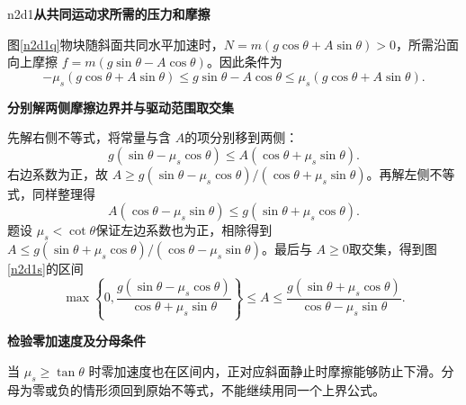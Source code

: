 \LectureAnswerSection

\begin{drillsolution}{n2d1}\textbf{从共同运动求所需的压力和摩擦}\par\nobreak
图\ref{n2d1q}物块随斜面共同水平加速时，$N=m(g\cos\theta+A\sin\theta)>0$，所需沿面向上摩擦 $f=m(g\sin\theta-A\cos\theta)$。因此条件为
\[-\mu_s(g\cos\theta+A\sin\theta)\le g\sin\theta-A\cos\theta\le\mu_s(g\cos\theta+A\sin\theta).\]



\par\medskip{}\noindent\textbf{分别解两侧摩擦边界并与驱动范围取交集}\par\nobreak
先解右侧不等式，将常量与含 $A$的项分别移到两侧：
\[
 g(\sin\theta-\mu_s\cos\theta)
 \le A(\cos\theta+\mu_s\sin\theta).
\]
右边系数为正，故 $A\ge g(\sin\theta-\mu_s\cos\theta)/(\cos\theta+\mu_s\sin\theta)$。再解左侧不等式，同样整理得
\[
 A(\cos\theta-\mu_s\sin\theta)
 \le g(\sin\theta+\mu_s\cos\theta).
\]
题设 $\mu_s<\cot\theta$保证左边系数也为正，相除得到 $A\le g(\sin\theta+\mu_s\cos\theta)/(\cos\theta-\mu_s\sin\theta)$。最后与 $A\ge0$取交集，得到图\ref{n2d1s}的区间
\[
 \max\left\{0,\frac{g(\sin\theta-\mu_s\cos\theta)}{\cos\theta+\mu_s\sin\theta}\right\}
 \le A\le\frac{g(\sin\theta+\mu_s\cos\theta)}{\cos\theta-\mu_s\sin\theta}.
\]


\par\medskip{}\noindent\textbf{检验零加速度及分母条件}\par\nobreak
当 $\mu_s\ge\tan\theta$ 时零加速度也在区间内，正对应斜面静止时摩擦能够防止下滑。分母为零或负的情形须回到原始不等式，不能继续用同一个上界公式。
\end{drillsolution}

